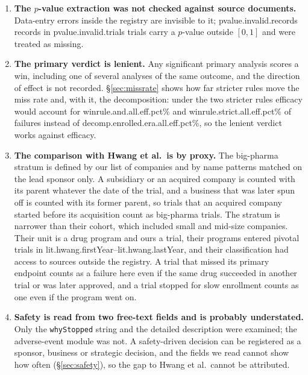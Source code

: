 \documentclass[11pt]{article}
\newcommand{\code}[1]{\texttt{\small #1}}
\begin{document}
\begin{enumerate}[leftmargin=*]
\item\label{lim:pvalue} \textbf{The $p$-value extraction was not checked against source documents.} Data-entry errors inside the registry are invisible to it; \num{pvalue.invalid.records} records in \num{pvalue.invalid.trials} trials carry a $p$-value outside $[0, 1]$ and were treated as missing.
\item\label{lim:winrule} \textbf{The primary verdict is lenient.} Any significant primary analysis scores a win, including one of several analyses of the same outcome, and the direction of effect is not recorded. \S\ref{sec:missrate} shows how far stricter rules move the miss rate and, with it, the decomposition: under the two stricter rules efficacy would account for \num{winrule.and.all.eff.pct}\% and \num{winrule.strict.all.eff.pct}\% of failures instead of \num{decomp.enrolled.era.all.eff.pct}\%, so the lenient verdict works against efficacy.
\item\label{lim:hwang} \textbf{The comparison with Hwang et al.\ is by proxy.} The big-pharma stratum is defined by our list of companies and by name patterns matched on the lead sponsor only. A subsidiary or an acquired company is counted with its parent whatever the date of the trial, and a business that was later spun off is counted with its former parent, so trials that an acquired company started before its acquisition count as big-pharma trials. The stratum is narrower than their cohort, which included small and mid-size companies. Their unit is a drug program and ours a trial, their programs entered pivotal trials in \num{lit.hwang.firstYear}--\num{lit.hwang.lastYear}, and their classification had access to sources outside the registry. A trial that missed its primary endpoint counts as a failure here even if the same drug succeeded in another trial or was later approved, and a trial stopped for slow enrollment counts as one even if the program went on.
\item\label{lim:safety} \textbf{Safety is read from two free-text fields and is probably understated.} Only the \code{whyStopped} string and the detailed description were examined; the adverse-event module was not. A safety-driven decision can be registered as a sponsor, business or strategic decision, and the fields we read cannot show how often (\S\ref{sec:safety}), so the gap to Hwang et al.\ cannot be attributed.

\end{enumerate}
\end{document}
